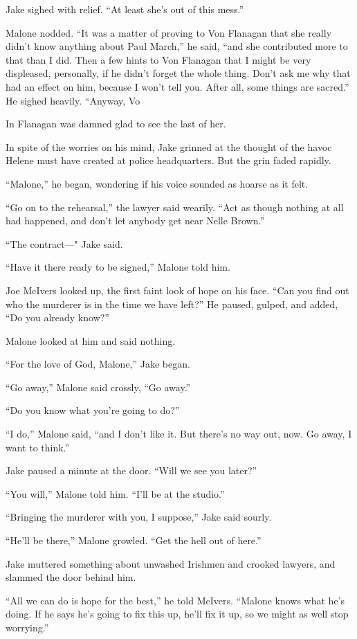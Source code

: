 \documentclass{novel}
\begin{document}
Jake sighed with relief. “At least she’s out of this mess.”

Malone nodded. “It was a matter of proving to Von Flanagan that she really didn’t know anything about Paul March,” he said, “and she contributed more to that than I did. Then a few hints to Von Flanagan that I might be very displeased, personally, if he didn’t forget the whole thing. Don’t ask me why that had an effect on him, because I won’t tell you. After all, some things are sacred.” He sighed heavily. “Anyway, Vo

In Flanagan was damned glad to see the last of her.

In spite of the worries on his mind, Jake grinned at the thought of the havoc Helene must have created at police headquarters. But the grin faded rapidly.

“Malone,” he began, wondering if his voice sounded as hoarse as it felt.

“Go on to the rehearsal,” the lawyer said wearily. “Act as though nothing at all had happened, and don’t let anybody get near Nelle Brown.”

“The contract—" Jake said.

“Have it there ready to be signed,” Malone told him.

Joe McIvers looked up, the first faint look of hope on his face. “Can you find out who the murderer is in the time we have left?” He paused, gulped, and added, “Do you already know?”

Malone looked at him and said nothing.

“For the love of God, Malone,” Jake began.

“Go away,” Malone said crossly, “Go away.”

“Do you know what you’re going to do?”

“I do,” Malone said, “and I don’t like it. But there’s no way out, now. Go away, I want to think.”

Jake paused a minute at the door. “Will we see you later?”

“You will,” Malone told him. “I’ll be at the studio.”

“Bringing the murderer with you, I suppose,” Jake said sourly.

“He’ll be there,” Malone growled. “Get the hell out of here.”

Jake muttered something about unwashed Irishmen and crooked lawyers, and slammed the door behind him.

“All we can do is hope for the best,” he told McIvers. “Malone knows what he’s doing. If he says he’s going to fix this up, he’ll fix it up, so we might as well stop worrying.”
\end{document}

